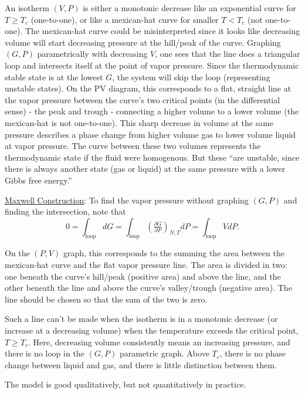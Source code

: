 \documentclass[12pt]{article}
\begin{document}
\begin{minipage}[t]{.56\textwidth}
    \setlength{\parindent}{.5cm}
    \scriptsize
    An isotherm \((V,P)\) is either a monotonic decrease like an exponential curve for \(T \geq T_c\) (one-to-one), 
    or like a mexican-hat curve for smaller \(T < T_c\) (not one-to-one). The mexican-hat curve could be misinterpreted
    since it looks like decreasing volume will start decreasing pressure at the hill/peak of the curve. Graphing 
    \((G,P)\) parametrically with decreasing \(V\), one sees that the line does a triangular loop and intersects itself 
    at the point of vapor pressure. Since the thermodynamic stable state is at the lowest \(G\), the system will skip 
    the loop (representing unstable states). On the PV diagram, this corresponds to a flat, straight line at the 
    vapor pressure between the curve's two critical points (in the differential sense) - the peak and trough - 
    connecting a higher volume to a lower volume (the mexican-hat is not one-to-one). This sharp decrease in volume at 
    the same pressure describes a phase change from higher volume gas to lower volume liquid at vapor pressure. The 
    curve between these two volumes represents the thermodynamic state if the fluid were homogenous. But these ``are
    unstable, since there is always another state (gas or liquid) at the same pressure with a lower Gibbs
    free energy.''

    \vspace{10pt}

    \underline{Maxwell Construction}:
    To find the vapor pressure without graphing \((G,P)\) and finding the intersection, note that
    \[0 = \int_\text{loop} dG = \int_\text{loop} \left( \tfrac{\partial G}{\partial P} \right)_{N,T} dP
        = \int_\text{loop} V dP.\] 
\end{minipage}

\vspace{15pt}
{\scriptsize \noindent
On the \((P,V)\) graph, this corresponds to the summing the area between the 
mexican-hat curve and the flat vapor pressure line. The area is divided in two: one beneath the curve's hill/peak 
(positive area) and above the line, and the other beneath the line and above the curve's valley/trough (negative area). The line
should be chosen so that the sum of the two is zero. 

\vspace{5pt}

Such a line can't be made when the isotherm is in a monotonic decrease (or increase at a decreasing volume) when 
the temperature exceeds the critical point, \(T \geq T_c\). Here, decreasing volume consistently means an 
increasing pressure, and there is no loop in the \((G,P)\) parametric graph. Above \(T_c\), there is no phase 
change between liquid and gas, and there is little distinction between them.

\vspace{5pt}

The model is good qualitatively, but not quantitatively in practice.

}
\end{document}
